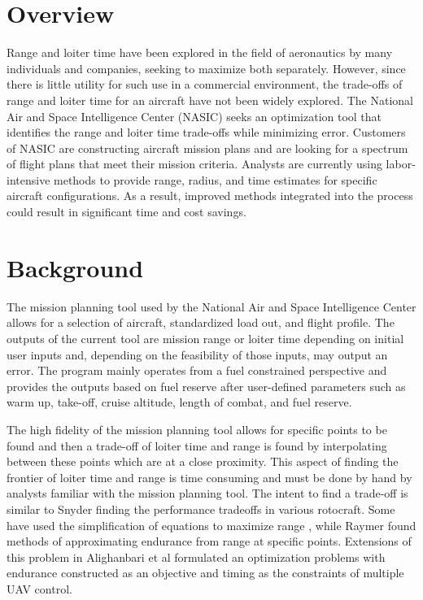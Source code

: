 \section{Overview}
\hspace{.5cm} Range and loiter time have been explored in the field of aeronautics by many individuals and companies, seeking to maximize both separately. However, since there is little utility for such use in a commercial environment, the trade-offs of range and loiter time for an aircraft have not been widely explored. The National Air and Space Intelligence Center (NASIC) seeks an optimization tool that identifies the range and loiter time trade-offs while minimizing error. Customers of NASIC are constructing aircraft mission plans and are looking for a spectrum of flight plans that meet their mission criteria. Analysts are currently using labor-intensive methods to provide range, radius, and time estimates for specific aircraft configurations. As a result, improved methods integrated into the process could result in significant time and cost savings. 

\section{Background}

\hspace{.5cm}The mission planning tool used by the National Air and Space Intelligence Center allows for a selection of aircraft, standardized load out, and flight profile. The outputs of the current tool are mission range or loiter time depending on initial user inputs and, depending on the feasibility of those inputs, may output an error. The program mainly operates from a fuel constrained perspective and provides the outputs based on fuel reserve after user-defined parameters such as warm up, take-off, cruise altitude, length of combat, and fuel reserve. \par
The high fidelity of the mission planning tool allows for specific points to be found and then a trade-off of loiter time and range is found by interpolating between these points which are at a close proximity. This aspect of finding the frontier of loiter time and range is time consuming and must be done by hand by analysts familiar with the mission planning tool. The intent to find a trade-off is similar to Snyder \cite{Tradeoffs} finding the performance tradeoffs in various rotocraft. Some have used the simplification of equations to maximize range \cite{breguetRangeEqn, OptimizeBreguet}, while Raymer \cite{LoiterTimeFromRange} found methods of approximating endurance from range at specific points. Extensions of this problem in Alighanbari et al \cite{Alighanbari} formulated an optimization problems with endurance constructed as an objective and timing as the constraints of multiple UAV control. 

